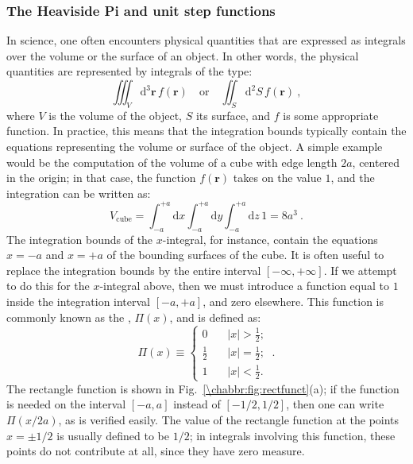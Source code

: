 \subsubsection{The Heaviside Pi and unit step functions}

In science, one often encounters physical quantities that are expressed as integrals over the volume or the surface of an object.  In other words, the physical quantities are represented by integrals of the type:
\begin{equation}
	\iiint_{V}\mathrm{d}^3\mathbf{r}\, f(\mathbf{r})\quad\text{or}\quad \iint_S\mathrm{d}^2S\,f(\mathbf{r})\ ,
\end{equation}
where $V$ is the volume of the object, $S$ its surface, and $f$ is some appropriate function. In practice, this means that the integration bounds typically contain the equations representing the volume or surface of the object. A simple example would be the computation of the volume of a cube with edge length $2a$, centered in the origin;  in that case, the function $f(\mathbf{r})$ takes on the value $1$, and the integration can be written as:
\begin{equation}
	V_{\text{cube}} = \int_{-a}^{+a}\!\!\!\!\!\mathrm{d}{x}\int_{-a}^{+a}\!\!\!\!\!\mathrm{d}{y}\int_{-a}^{+a}\!\!\!\!\!\mathrm{d}{z}\,1 = 8a^3\ .\label{\chabbr:eq:vcube1}
\end{equation}
The integration bounds of the $x$-integral, for instance, contain the equations $x=-a$ and $x=+a$ of the bounding surfaces of the cube.  It is often useful to replace the integration bounds by the entire interval $[-\infty,+\infty]$.  If we attempt to do this for the $x$-integral above, then we must introduce a function equal to $1$ inside the integration interval $[-a,+a]$, and zero elsewhere.  This function is commonly known as the , $\Pi(x)$, and is defined as:
\begin{equation}
\Pi(x) \equiv \left\{\begin{array}{lcl}
0 & \, & \vert x\vert>\frac{1}{2};\\[3pt]
\frac{1}{2} && \vert x\vert = \frac{1}{2};\\[3pt]
1 && \vert x\vert<\frac{1}{2}.
\end{array}\right.\ .\label{\chabbr:eq:defrectfunct}
\end{equation}
The rectangle function is shown in Fig.~\ref{\chabbr:fig:rectfunct}(a);  if the function is needed on the interval $[-a,a]$ instead of $[-1/2,1/2]$, then one can write $\Pi(x/2a)$, as is verified easily.  The value of the rectangle function at the points $x=\pm1/2$ is usually defined to be $1/2$; in integrals involving this function, these points do not contribute at all, since they have zero measure.

